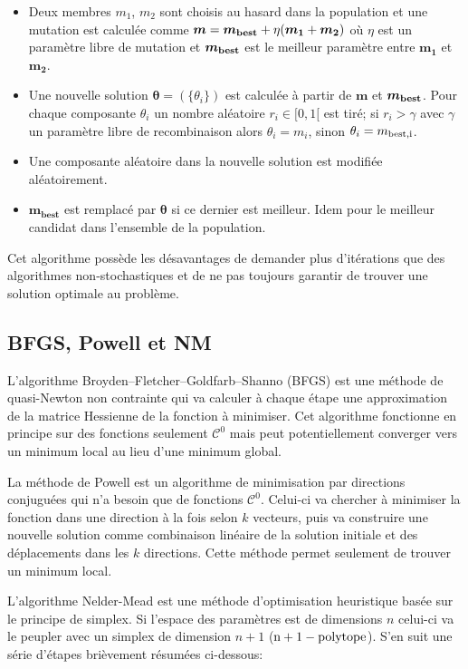 \documentclass[a4paper,11pt]{article}
\numberwithin{equation}{section}
\begin{document}
      \begin{itemize}
        \item Deux membres $m_1$, $m_2$ sont choisis au hasard dans la population et une mutation est calculée comme $\bm{m} = \bm{m_{\rm{best}}} + \eta (\bm{m_1} + \bm{m_2})$ où $\eta$ est un paramètre libre de mutation et $\bm{m_{\rm{best}}}$ est le meilleur paramètre entre $\bm{m_1}$ et $\bm{m_2}$.
        \item  Une nouvelle solution $\bm{\theta} = (\lbrace \theta_i \rbrace )$ est calculée à partir de $\bm{m}$ et $\bm{m_{\rm{best}}}$. Pour chaque composante $\theta_i$ un nombre aléatoire $r_i \in [0,1[$ est tiré; si $r_i > \gamma$ avec $\gamma$ un paramètre libre de recombinaison alors $\theta_i = m_i$, sinon $\theta_i = m_{\rm{best}, i}$.
        \item Une composante aléatoire dans la nouvelle solution est modifiée aléatoirement.
        \item $\bm{m_{best}}$ est remplacé par $\bm{\theta}$ si ce dernier est meilleur. Idem pour le meilleur candidat dans l'ensemble de la population.
      \end{itemize}
      
      Cet algorithme possède les désavantages de demander plus d'itérations que des algorithmes non-stochastiques et de ne pas toujours garantir de trouver une solution optimale au problème. 
      
  \newpage
  \subsection{BFGS, Powell et NM}
    L'algorithme Broyden–Fletcher–Goldfarb–Shanno (BFGS)\cite{BFGS} est une méthode de quasi-Newton non contrainte qui va calculer à chaque étape une approximation de la matrice Hessienne de la fonction à minimiser. Cet algorithme fonctionne en principe sur des fonctions seulement $\mathscr{C}^0$ mais peut potentiellement converger vers un minimum local au lieu d'une minimum global.\par
    La méthode de Powell est un algorithme de minimisation par directions conjuguées\cite{Powell} qui n'a besoin que de fonctions $\mathscr{C}^0$. Celui-ci va chercher à minimiser la fonction dans une direction à la fois selon $k$ vecteurs, puis va construire une nouvelle solution comme combinaison linéaire de la solution initiale et des déplacements dans les $k$ directions. Cette méthode permet seulement de trouver un minimum local.\par
    L'algorithme Nelder-Mead\cite{NelderMead} est une méthode d'optimisation heuristique basée sur le principe de simplex. Si l'espace des paramètres est de dimensions $n$ celui-ci va le peupler avec un simplex de dimension $n+1$ ($\rm{n+1-polytope}$). S'en suit une série d'étapes brièvement résumées ci-dessous:
    
\end{document}
